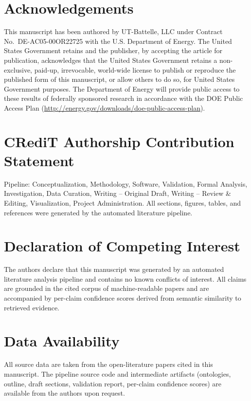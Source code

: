 \documentclass[review,12pt,a4paper]{elsarticle}
\begin{document}
\section*{Acknowledgements}
This manuscript has been authored by UT-Battelle, LLC under Contract No.~DE-AC05-00OR22725 with the U.S. Department of Energy. The United States Government retains and the publisher, by accepting the article for publication, acknowledges that the United States Government retains a non-exclusive, paid-up, irrevocable, world-wide license to publish or reproduce the published form of this manuscript, or allow others to do so, for United States Government purposes. The Department of Energy will provide public access to these results of federally sponsored research in accordance with the DOE Public Access Plan (\url{http://energy.gov/downloads/doe-public-access-plan}).

\section*{CRediT Authorship Contribution Statement}
Pipeline: Conceptualization, Methodology, Software, Validation, Formal Analysis, Investigation, Data Curation, Writing -- Original Draft, Writing -- Review \& Editing, Visualization, Project Administration. All sections, figures, tables, and references were generated by the automated literature pipeline.

\section*{Declaration of Competing Interest}
The authors declare that this manuscript was generated by an automated literature analysis pipeline and contains no known conflicts of interest. All claims are grounded in the cited corpus of machine-readable papers and are accompanied by per-claim confidence scores derived from semantic similarity to retrieved evidence.

\section*{Data Availability}
All source data are taken from the open-literature papers cited in this manuscript. The pipeline source code and intermediate artifacts (ontologies, outline, draft sections, validation report, per-claim confidence scores) are available from the authors upon request.



\end{document}
